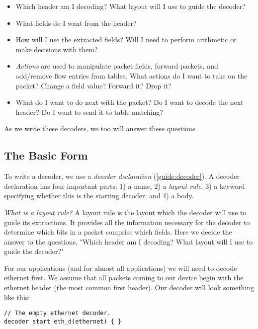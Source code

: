 \begin{itemize}
\item Which header am I decoding? What layout will I use to guide the decoder?

\item What fields do I want from the header?

\item How will I use the extracted fields? Will I need to perform arithmetic or make decisions with them?

\item \textit{Actions} are used to manipulate packet fields, forward packets, and add/remove flow entries from tables. What actions do I want to take on the packet? Change a field value? Forward it? Drop it? 

\item What do I want to do next with the packet? Do I want to decode the next header? Do I want to send it to table matching? 
\end{itemize}

As we write these decoders, we too will answer these questions.

\subsection{The Basic Form} \label{tut:basic_decoder}

To write a decoder, we use a \textit{decoder declaration} (\ref{guide:decoder}). A decoder declaration has four important parts: 1) a name, 2) a \textit{layout rule}, 3) a keyword specifying whether this is the starting decoder, and 4) a body.

\textit{What is a layout rule?} A layout rule is the layout which the decoder will use to guide its extractions. It provides all the information necessary for the decoder to determine which bits in a packet comprise which fields. Here we decide the answer to the questions, "Which header am I decoding? What layout will I use to guide the decoder?"

For our applications (and for almost all applications) we will need to decode ethernet first. We assume that all packets coming to our device begin with the ethernet header (the most common first header). Our decoder will look something like this:

\begin{codepage}
\begin{lstlisting}
// The empty ethernet decoder.
decoder start eth_d(ethernet) { }
\end{lstlisting}
\end{codepage}

